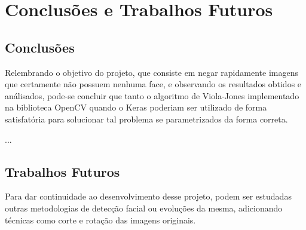 \chapter{Conclusões e Trabalhos Futuros}\label{cap:conclusao}

\section{Conclusões}

Relembrando o objetivo do projeto, que consiste em negar rapidamente imagens que certamente não possuem nenhuma face, e observando os resultados obtidos e análisados, pode-se concluir que tanto o algoritmo de Viola-Jones implementado na biblioteca OpenCV quando o Keras poderiam ser utilizado de forma satisfatória para solucionar tal problema se parametrizados da forma correta.

...

\section{Trabalhos Futuros}

Para dar continuidade ao desenvolvimento desse projeto, podem ser estudadas outras metodologias de detecção facial ou evoluções da mesma, adicionando técnicas como corte e rotação das imagens originais.
